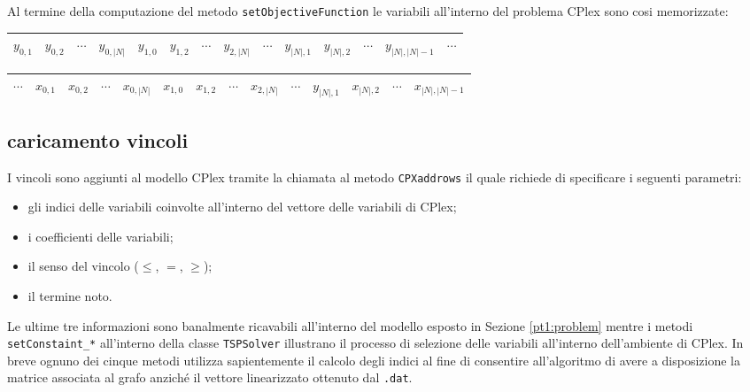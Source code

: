 Al termine della computazione del metodo \texttt{setObjectiveFunction} le variabili all'interno del problema CPlex sono cosi memorizzate:

\begin{tabular}{|c|c|c|c|c|c|c|c|c|c|c|c|c|c}
\hline 
$y_{0,1}$ & $y_{0,2}$ & $\cdots$ & $y_{0,\left|N\right|}$ & $y_{1,0}$ & $y_{1,2}$ & $ \cdots $ & $y_{2,\left|N\right|}$ & $\cdots$ & $y_{\left|N\right|,1}$ & $y_{\left|N\right|,2}$ & $\cdots$ & $y_{\left|N\right|,\left|N\right| - 1}$ & $\cdots$\\ 
\hline 
\end{tabular}

\begin{tabular}{c|c|c|c|c|c|c|c|c|c|c|c|c|c|}
\hline 
$\cdots$ & $x_{0,1}$ & $x_{0,2}$ & $\cdots$ & $x_{0,\left|N\right|}$ & $x_{1,0}$ & $x_{1,2}$ & $ \cdots $ & $x_{2,\left|N\right|}$ & $\cdots$ & $y_{\left|N\right|,1}$ & $x_{\left|N\right|,2}$ & $\cdots$ & $x_{\left|N\right|,\left|N\right| - 1}$\\ 
\hline 
\end{tabular}  

\subsection[Caricamento vincoli]{caricamento vincoli}
\label{pt1:solver:constraint}
I vincoli sono aggiunti al modello CPlex tramite la chiamata al metodo \texttt{CPXaddrows} il quale richiede di specificare i seguenti parametri:

\begin{itemize}
\item gli indici delle variabili coinvolte all'interno del vettore delle variabili di CPlex;
\item i coefficienti delle variabili;
\item il senso del vincolo ($\le$, $=$, $\ge$);
\item il termine noto.
\end{itemize}

Le ultime tre informazioni sono banalmente ricavabili all'interno del modello esposto in Sezione \ref{pt1:problem} mentre i metodi \texttt{setConstaint\_*} all'interno della classe \texttt{TSPSolver} illustrano il processo di selezione delle variabili all'interno dell'ambiente di CPlex. In breve ognuno dei cinque metodi utilizza sapientemente il calcolo degli indici al fine di consentire all'algoritmo di avere a disposizione la matrice associata al grafo anziché il vettore linearizzato ottenuto dal  \texttt{.dat}.

